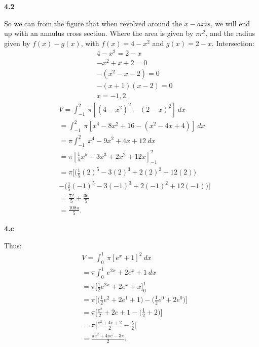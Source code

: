 \documentclass{report}
\begin{document}
    \pagebreak \bigbreak \noindent 
    \textbf{4.2}
    \bigbreak \noindent 
    \begin{minipage}[]{0.47\textwidth}
    \end{minipage}
    \begin{minipage}[]{0.47\textwidth}
        So we can from the figure that when revolved around the $x-axis$, we will end up with an annulus cross section. Where the area is given by $\pi r^{2}$, and the radius given by $f(x) - g(x)$, with $f(x)= 4-x^{2}$ and $g(x)=2-x$.
        \bigbreak \noindent 
        Intersection:
        \begin{align*}
            &4-x^{2} = 2-x \\
            &-x^{2}+x+2 = 0 \\
            &-(x^{2}-x-2) = 0\\
            &-(x+1)(x-2) =0 \\
            &x=-1,2
        .\end{align*}
        \begin{align*}
            &V = \int_{-1}^{2}\ \pi\left[(4-x^{2})^{2}-(2-x)^{2}\right]\ dx \\
            &=\int_{-1}^{2}\ \pi\left[x^{4}-8x^{2}+16-(x^{2}-4x+4)\right]\ dx \\
            &=\pi \int_{-1}^{2}\ x^{4}-9x^{2}+4x+12\ dx \\
            &=\pi\left[\frac{1}{5}x^{5}-3x^{3}+2x^{2}+12x\right]_{-1}^{2} \\
            &= \pi\bigg[\bigg(\frac{1}{5}(2)^{5}-3(2)^{3}+2(2)^{2}+12(2)\bigg) \\ 
            &-\bigg(\frac{1}{5}(-1)^{5}-3(-1)^{3}+2(-1)^{2}+12(-1)\bigg)\bigg] \\
            &=\frac{72}{5}+\frac{36}{5} \\
            &=\frac{108\pi}{5}
        .\end{align*}
    \end{minipage}
    \bigbreak \noindent 
    \textbf{4.c}
    \bigbreak \noindent 
    \begin{minipage}[]{0.47\textwidth}
    \end{minipage}
    \begin{minipage}[]{0.47\textwidth}
        Thus:
        \begin{align*}
            &V = \int_{0}^{1}\ \pi[e^{x}+1]^{2}\ dx \\
            &=\pi \int_{0}^{1}\ e^{2x}+2e^{x}+1\ dx\\
            &=\pi\bigg[\frac{1}{2}e^{2x}+2e^{x}+x\bigg]_0^{1} \\
            &= \pi \bigg[\bigg(\frac{1}{2}e^2+2e^{1}+1\bigg)-\bigg(\frac{1}{2}e^{0}+2e^{0}\bigg)\bigg] \\
            &= \pi \bigg[\frac{e^{2}}{2}+2e+1- \bigg(\frac{1}{2}+2\bigg)\bigg] \\
            &= \pi\bigg[\frac{e^{2}+4e+2}{2}-\frac{5}{2}\bigg] \\
            &=\frac{\pi e^{2}+4\pi e -3\pi}{2}
        .\end{align*}
    
    \end{minipage}
\end{document}

